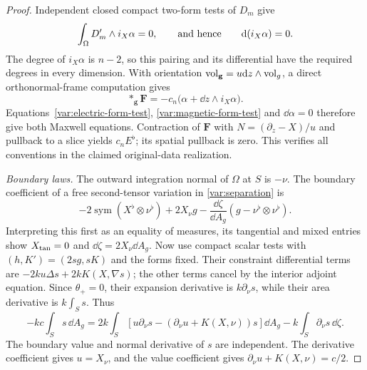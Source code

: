\begin{proof}
Independent closed compact two-form tests of $D_m$ give
\begin{equation}
 \int_\Omega D_m'\wedge i_X\alpha=0,
 \qquad\hbox{and hence}\qquad \mathrm d(i_X\alpha)=0.
 \label{var:magnetic-form-test}
\end{equation}
The degree of $i_X\alpha$ is $n-2$, so this pairing
and its differential have the required degrees in
every dimension.  With orientation
$\operatorname{vol}_{\mathbf g}=u\mathrm d z\wedge\operatorname{vol}_g$, a direct
orthonormal-frame computation gives
\begin{equation}
 *_\mathbf g\mathbf F=-c_n
          \bigl(\alpha+\dd z\wedge i_X\alpha\bigr).
 \label{var:star-field}
\end{equation}
Equations~\eqref{var:electric-form-test},
\eqref{var:magnetic-form-test} and $\dd\alpha=0$
therefore give both Maxwell equations.  Contraction
of $\mathbf F$ with $N=(\partial_z-X)/u$ and pullback
to a slice yields $c_nE^\flat$; its spatial pullback
is zero.  This verifies all conventions in the
claimed original-data realization.

\emph{Boundary laws.}
The outward integration normal of $\Omega$ at $S$
is $-\nu$.  The boundary coefficient of a free
second-tensor variation in \eqref{var:separation} is
\begin{equation}
 -2\operatorname{sym}(X^\flat\otimes\nu^\flat)
       +2X_\nu g
       -\frac{\dd\zeta}{\dd A_g}
                         (g-\nu^\flat\otimes\nu^\flat).
 \label{var:boundary-pairing-k}
\end{equation}
Interpreting this first as an equality of measures,
its tangential and mixed entries show
$X_{\rm tan}=0$ and $\dd\zeta=2X_\nu\dd A_g$.
Now use compact scalar tests with
$(h,K')=(2s g,sK)$ and the forms fixed.  Their
constraint differential terms are
$-2ku\Delta s+2kK(X,\nabla s)$; the other terms
cancel by the interior adjoint equation.  Since
$\theta_+=0$, their expansion derivative is
$k\partial_\nu s$, while their area derivative is
$k\int_Ss$.  Thus
\begin{equation}
 -kc\int_Ss\,\dd A_g
 =2k\int_S\left[u\partial_\nu s
       -(\partial_\nu u+K(X,\nu))s\right]\dd A_g
             -k\int_S\partial_\nu s\,\dd\zeta.
 \label{var:boundary-conformal-pairing}
\end{equation}
The boundary value and normal derivative of $s$ are
independent.  The derivative coefficient gives
$u=X_\nu$, and the value coefficient gives
$\partial_\nu u+K(X,\nu)=c/2$.


\end{proof}
